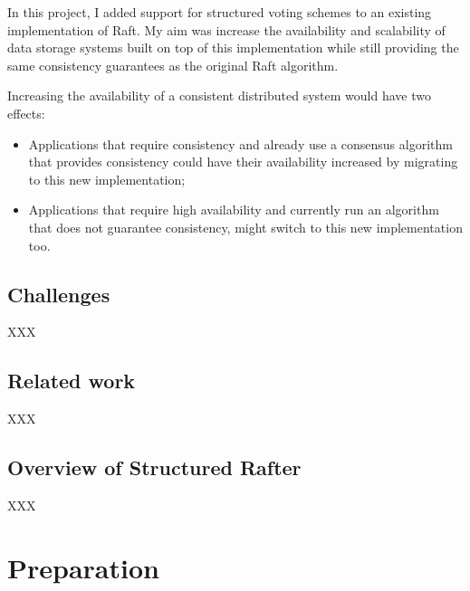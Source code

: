 \documentclass[11pt,chapterprefix=true,toc=bibliography,numbers=noendperiod,
               footnotes=multiple,twoside]{scrreprt}
\begin{document}
In this project, I added support for structured voting schemes to an existing implementation of Raft. My aim was increase the availability and scalability of data storage systems built on top of this implementation while still providing the same consistency guarantees as the original Raft algorithm.

Increasing the availability of a consistent distributed system would have two effects:

\begin{itemize}
    \item Applications that require consistency and already use a consensus algorithm that provides consistency could have their availability increased by migrating to this new implementation;
    \item Applications that require high availability and currently run an algorithm that does not guarantee consistency, might switch to this new implementation too.
\end{itemize}

\section{Challenges\label{sc:challenges}}

XXX

\section{Related work\label{sc:related-work}}

XXX

\section{Overview of Structured Rafter\label{sc:overview-of-structured-rafter}}

XXX

\chapter{Preparation\label{ch:preparation}}

\end{document}
